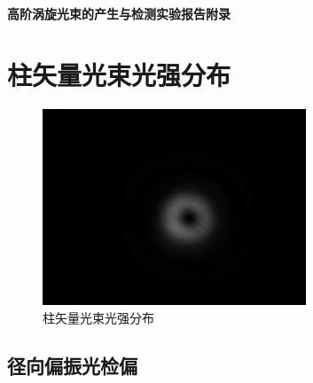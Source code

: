 \documentclass[a4paper,UTF8]{ctexart}
\begin{document}
\begin{center}
    \textbf{\Large 高阶涡旋光束的产生与检测实验报告附录}
    \par {}
\end{center}

\section{柱矢量光束光强分布}

\begin{figure}[H]
    \centering
    \begin{minipage}[b]{0.9\textwidth}
        \centering
        \includegraphics[width=0.7\textwidth]{./fig/1.png}
        \caption{柱矢量光束光强分布}
    \end{minipage}
\end{figure}

\subsection{径向偏振光检偏}
\end{document}
